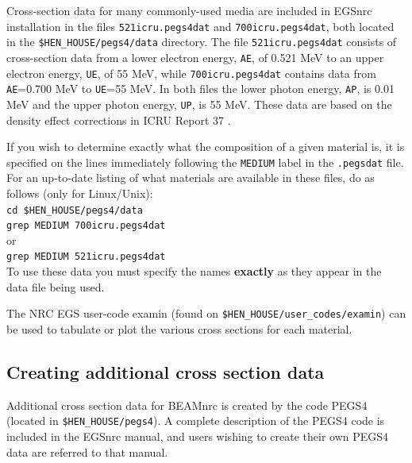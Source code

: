 \documentclass[12pt,twoside]{article}
\begin{document}
Cross-section data for many commonly-used media are included in EGSnrc installation
in the files {\tt 521icru.pegs4dat} and {\tt 700icru.pegs4dat}, both
located in the {\tt \$HEN\_HOUSE/pegs4/data} directory.
The file {\tt 521icru.pegs4dat} consists of cross-section data
from a lower electron energy, {\tt AE}, of 0.521 MeV to an upper
electron energy, {\tt UE}, of 55 MeV, while {\tt 700icru.pegs4dat}
contains data from {\tt AE}=0.700 MeV to {\tt UE}=55 MeV.  In both
files the lower photon energy, {\tt AP}, is 0.01 MeV and
the upper photon energy, {\tt UP}, is 55 MeV.   These data are based on the
density effect corrections in ICRU Report 37 \cite{ICRU37}.

If you wish to determine exactly what the composition of a given
material is, it is specified on the lines immediately following the
\verb+MEDIUM+ label in the {\tt .pegsdat} file.  For an up-to-date listing of
what materials are available in these files, do as follows
(only for Linux/Unix):\\
\verb+cd $HEN_HOUSE/pegs4/data+\\
\verb+grep MEDIUM 700icru.pegs4dat+
\\or\\
\verb+grep MEDIUM 521icru.pegs4dat+\\
To use these data you must specify the names {\bf exactly} as they
appear in the data file being used.

The NRC EGS user-code examin (found on {\tt \$HEN\_HOUSE/user\_codes/examin}) can
be used to tabulate or plot the various cross sections for each
material.

\subsection{Creating additional cross section data}

Additional cross section data for BEAMnrc is created by the code PEGS4
(located in {\tt \$HEN\_HOUSE/pegs4}).
A complete description of the PEGS4 code is included in the EGSnrc
manual\cite{KR03}, and users wishing to create their own PEGS4 data
are referred to that manual.
\end{document}

